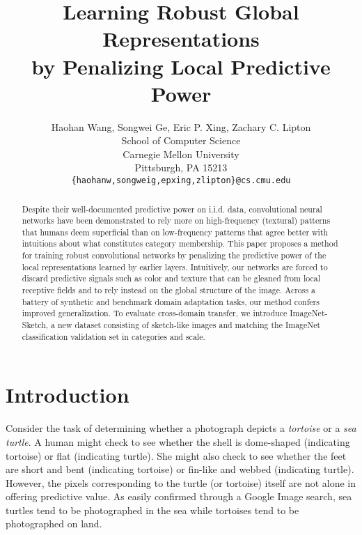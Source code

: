 \documentclass{article}
\title{
Learning Robust Global Representations\\
by Penalizing Local Predictive Power
}
\author{Haohan Wang, Songwei Ge, Eric P. Xing,
  Zachary C. Lipton \\
  School of Computer Science\\
  Carnegie Mellon University\\
  Pittsburgh, PA 15213 \\
  \texttt{\{haohanw,songweig,epxing,zlipton\}@cs.cmu.edu} \\
}
\begin{document}
\maketitle

\begin{abstract}
Despite their well-documented predictive power on i.i.d. data,
convolutional neural networks have been demonstrated
to rely more on high-frequency (textural) patterns 
that humans deem superficial 
than on low-frequency patterns 
that agree better with intuitions 
about what constitutes category membership.
This paper proposes a method for training robust convolutional networks
by penalizing the predictive power 
of the local representations learned by earlier layers.
Intuitively, our networks are forced to discard predictive signals 
such as color and texture that can be gleaned from local receptive fields
and to rely instead on the global structure of the image.
Across a battery of synthetic and benchmark domain adaptation tasks,
our method confers improved generalization. To evaluate cross-domain transfer,
we introduce ImageNet-Sketch, 
a new dataset consisting of sketch-like images
and matching the ImageNet classification validation set 
in categories and scale.





%
 \end{abstract}

\section{Introduction}
\label{sec:intro}
Consider the task of determining whether a photograph 
depicts a \emph{tortoise} or a \emph{sea turtle}.
A human might check to see whether the shell
is dome-shaped (indicating tortoise) or flat (indicating turtle).
She might also check to see whether the feet 
are short and bent (indicating tortoise)
or fin-like and webbed (indicating turtle).
However, the pixels corresponding to the turtle (or tortoise) itself 
are not alone in offering predictive value.
As easily confirmed through a Google Image search,
sea turtles tend to be photographed in the sea
while tortoises tend to be photographed on land.
\end{document}
